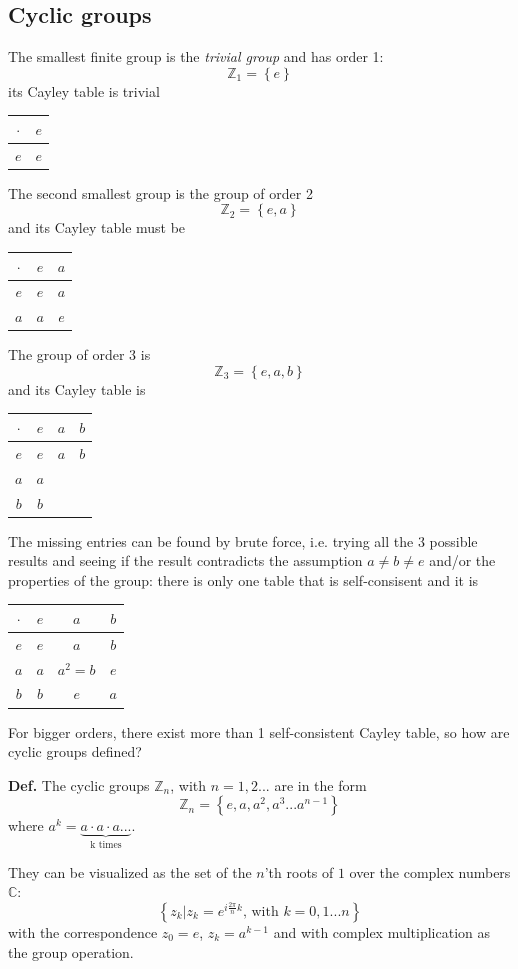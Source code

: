 \subsection{Cyclic groups}
The smallest finite group is the \textit{trivial group} and has order 1:
$$\mathbb{Z}_1 = \left\{e\right\}$$
its Cayley table is trivial
\begin{table}[ht!]
    \centering
\begin{tabular}{c|c}
    $\cdot$&$e$\\ \hline
    $e$&$e$
\end{tabular}
\end{table}

The second smallest group is the group of order 2
$$\mathbb{Z}_2 = \left\{e,a\right\}$$
and its Cayley table must be
\begin{table}[ht!]
    \centering
    \begin{tabular}{c|cc}
	$\cdot$	&$e$	&$a$\\ \hline
	$e$	&$e$&$a$\\
	$a$	&$a$&$e$\\
    \end{tabular} 
\end{table}
The group of order 3 is
$$\mathbb{Z}_3 = \left\{e,a,b\right\}$$
and its Cayley table is
\begin{table}[ht!]
\centering
\begin{tabular}{c|ccc}
    $\cdot$	&$e$	&$a$	&$b$\\ \hline
	$e$	&$e$	&$a$	&$b$\\
	$a$	&$a$	&	& \\
	$b$	&$b$	&	& \\
\end{tabular}
\end{table}

The missing entries can be found by brute force, i.e. trying all the 3 possible
results and seeing if the result contradicts the assumption $a\neq b\neq e$ and/or
the properties of the group: there is only one table that is self-consisent and it is
\begin{table}[ht!]
\centering
\begin{tabular}{c|ccc}
    $\cdot$	&$e$	&$a$	&$b$\\ \hline
	$e$	&$e$	&$a$	&$b$\\
	$a$	&$a$	&$a^2=b$	&$e$ \\
	$b$	&$b$	&$e$	&$a$ \\
\end{tabular}
\end{table}

For bigger orders, there exist more than 1 self-consistent Cayley table, so how are
cyclic groups defined?

\textbf{Def.} The cyclic groups $\mathbb{Z}_n$, with $n=1,2...$ are in the form
$$\mathbb{Z}_n = \left\{e,a,a^2,a^3...a^{n-1}\right\}$$
where $a^k = \underbrace{a\cdot a\cdot a ...}_\text{k times}$.

They can be visualized as the set of the $n$'th roots of $1$ over the complex numbers
$\mathbb{C}$:
$$\left\{z_k|z_k = e^{i\frac{2\pi}{n}k}\text{, with }k=0,1...n\right\}$$
with the correspondence $z_0=e$, $z_k = a^{k-1}$ and with complex multiplication
as the group operation.
